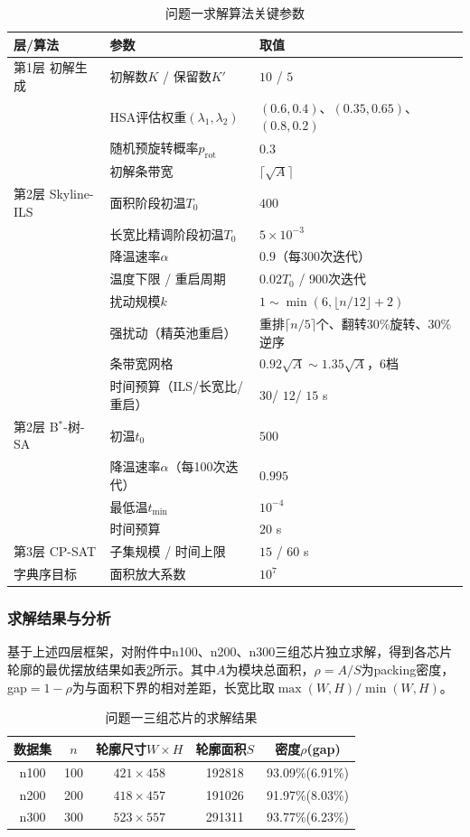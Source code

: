 \documentclass{JXUSTmodeling}
\begin{document}
\begin{table}[!htbp]
	\centering
	\small
	\caption{\label{tab:p1_params}问题一求解算法关键参数}
	\begin{tabularx}{\textwidth}{@{}lXX@{}}
		\toprule[1.5pt]
		层/算法&参数&取值\\
		\midrule
		第1层 初解生成&初解数$K$ / 保留数$K'$&$10$ / $5$\\
		&HSA评估权重$(\lambda_1,\lambda_2)$&$(0.6,0.4)$、$(0.35,0.65)$、$(0.8,0.2)$\\
		&随机预旋转概率$p_{\mathrm{rot}}$&$0.3$\\
		&初解条带宽&$\lceil\sqrt{A}\rceil$\\
		第2层 Skyline-ILS&面积阶段初温$T_0$&$400$\\
		&长宽比精调阶段初温$T_0$&$5\times10^{-3}$\\
		&降温速率$\alpha$&$0.9$（每300次迭代）\\
		&温度下限 / 重启周期&$0.02T_0$ / 900次迭代\\
		&扰动规模$k$&$1\sim\min(6,\lfloor n/12\rfloor+2)$\\
		&强扰动（精英池重启）&重排$\lceil n/5\rceil$个、翻转$30\%$旋转、$30\%$逆序\\
		&条带宽网格&$0.92\sqrt{A}\sim1.35\sqrt{A}$，6档\\
		&时间预算（ILS/长宽比/重启）&$30$/ $12$/ $15$ s\\
		第2层 B$^{\ast}$-树-SA&初温$t_0$&$500$\\
		&降温速率$\alpha$（每100次迭代）&$0.995$\\
		&最低温$t_{\min}$&$10^{-4}$\\
		&时间预算&$20$ s\\
		第3层 CP-SAT&子集规模 / 时间上限&$15$ / $60$ s\\
		字典序目标&面积放大系数&$10^{7}$\\
		\bottomrule[1.5pt]
	\end{tabularx}
\end{table}

\subsubsection{求解结果与分析}
基于上述四层框架，对附件中n100、n200、n300三组芯片独立求解，得到各芯片轮廓的最优摆放结果如表\ref{tab:p1_result}所示。其中$A$为模块总面积，$\rho=A/S$为packing密度，gap$=1-\rho$为与面积下界的相对差距，长宽比取$\max(W,H)/\min(W,H)$。

\begin{table}[!htbp]
	\centering
	\caption{\label{tab:p1_result}问题一三组芯片的求解结果}
	\begin{tabular}{ccccc}
		\toprule[1.5pt]
		数据集&$n$&轮廓尺寸$W\times H$&轮廓面积$S$&密度$\rho$(gap)\\
		\midrule
		n100&100&$421\times458$&192818&93.09\%(6.91\%)\\
		n200&200&$418\times457$&191026&91.97\%(8.03\%)\\
		n300&300&$523\times557$&291311&93.77\%(6.23\%)\\
		\bottomrule[1.5pt]
	\end{tabular}
\end{table}
\end{document}

